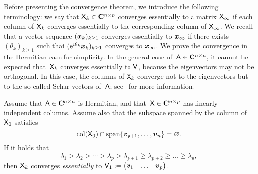 Before presenting the convergence theorem,
we introduce the following terminology: we say that $\mathsf X_k \in \mathbf C^{n \times p}$ converges essentially to a matrix $\mathsf X_{\infty}$
if each column of $\mathsf X_k$ converges essentially to the corresponding column of $\mathsf X_{\infty}$.
We recall that a vector sequence $(\mathbf{\boldsymbol{x}}_k)_{k \geq 1}$ converges essentially to $\mathbf{\boldsymbol{x}}_{\infty}$ if there exists $(\theta_k)_{k \geq 1}$
such that $(\mathrm e^{i \theta_k} \mathbf{\boldsymbol{x}}_k)_{k \geq 1}$ converges to $\mathbf{\boldsymbol{x}}_{\infty}$.
We prove the convergence in the Hermitian case for simplicity.
In the general case of~$\mathsf A \in \mathbf C^{n \times n}$,
it cannot be expected that~$\mathsf X_k$ converges essentially to $\mathsf V$,
because the eigenvectors may not be orthogonal.
In this case, the columns of $\mathsf X_k$ converge not to the eigenvectors
but to the so-called Schur vectors of~$\mathsf A$;
see~\cite{MR3396212} for more information.
\begin{theorem}
    \label{theorem:convergence_subspace_iteration}
    Assume that $\mathsf A \in \mathbf C^{n \times n}$ is Hermitian,
    and that~$\mathsf X \in \mathbf C^{n \times p}$ has linearly independent columns.
    Assume also that the subspace spanned by the column of~$\mathsf X_0$ satisfies
    \begin{equation}
        \label{eq:assumption_subspace_iteration}
        \operatorname{col}(\mathsf X_0) \cap \operatorname{span} \{ \mathbf{\boldsymbol{v}}_{p+1}, \dotsc, \mathbf{\boldsymbol{v}}_n \} = \varnothing.
    \end{equation}
    If it holds that
    \begin{equation}
        \label{eq:order_eigenvalues}
        \lambda_1 > \lambda_2 > \dotsb > \lambda_p > \lambda_{p+1} \geq \lambda_{p+2} \geq \dotsc \geq \lambda_n,
    \end{equation}
    then $\mathsf X_k$ converges \emph{essentially} to $\mathsf V_1 := \begin{pmatrix} \mathbf{\boldsymbol{v}}_1 & \hdots & \mathbf{\boldsymbol{v}}_p \end{pmatrix}$.
\end{theorem}
